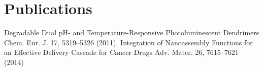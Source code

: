 \section{Publications}


	\publicationgroup
	{Degradable Dual pH- and Temperature-Responsive Photoluminescent Dendrimers}
	{ Chem. Eur. J. 17, 5319–5326 (2011).}
	\publicationgroup
	{Integration of Nanoassembly Functions for an Effective Delivery Cascade for Cancer Drugs}
	{ Adv. Mater. 26, 7615–7621 (2014)}

